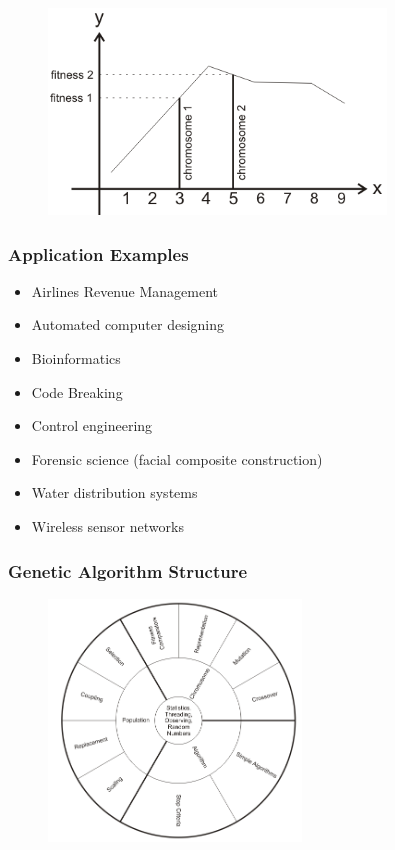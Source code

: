 \documentclass{beamer}%
\begin{document}
\begin{frame}
\frametitle{}
\begin{figure}
\centering
  \includegraphics[width=0.8\textwidth]{images/1.png}
\end{figure}
\end{frame}


\begin{frame}
\frametitle{Application Examples}
\begin{itemize}
\item Airlines Revenue Management
\item Automated computer designing
\item Bioinformatics
\item Code Breaking
\item Control engineering
\item Forensic science (facial composite construction)
\item Water distribution systems
\item Wireless sensor networks
\end{itemize}
\end{frame}


\begin{frame}
\frametitle{Genetic Algorithm Structure}
\begin{figure}
\centering
  \includegraphics[width=0.6\textwidth]{images/2.png}
\end{figure}
\end{frame}
\end{document}
